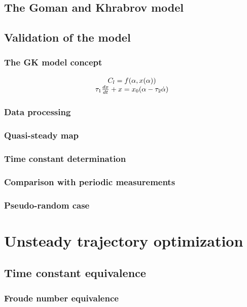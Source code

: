 \documentclass[compress]{beamer}
\begin{document}
\subsection{The Goman and Khrabrov model}

\subsection{Validation of the model}
\begin{frame}
  \frametitle{The GK model concept}
  \begin{equation*}
    \begin{array}[c]{c}
  C_l= f(\alpha,x(\alpha)) \\
  \tau_1 \frac{dx}{dt} +x = x_0(\alpha - \tau_2 \dot{\alpha}) 
    \end{array}
  \end{equation*}
\end{frame}

\begin{frame}
  \frametitle{Data processing}
\end{frame}

\begin{frame}
  \frametitle{Quasi-steady map}
\end{frame}

\begin{frame}
  \frametitle{Time constant determination}
\end{frame}

\begin{frame}
  \frametitle{Comparison with periodic measurements}
\end{frame}

\begin{frame}
  \frametitle{Pseudo-random case}
\end{frame}


\section[Unsteady optimization]{Unsteady trajectory optimization}

\subsection{Time constant equivalence}

\begin{frame}
  \frametitle{Froude number equivalence}
\end{frame}
\end{document}
